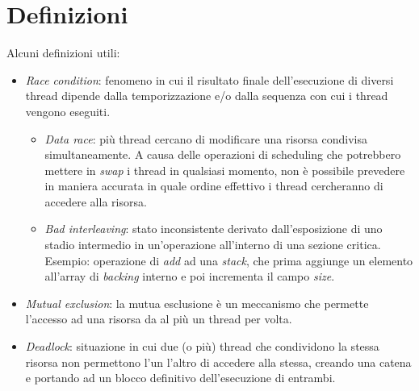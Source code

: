 \section{Definizioni}
Alcuni definizioni utili:
\begin{itemize}
	\item \textit{Race condition}: fenomeno in cui il risultato finale dell'esecuzione di diversi thread dipende dalla temporizzazione e/o dalla sequenza con cui i thread vengono eseguiti.
	\begin{itemize}
		\item \textit{Data race}: più thread cercano di modificare una risorsa condivisa simultaneamente. A causa delle operazioni di scheduling che potrebbero mettere in \textit{swap} i thread in qualsiasi momento, non è possibile prevedere in maniera accurata in quale ordine effettivo i thread cercheranno di accedere alla risorsa.
		\item \textit{Bad interleaving}: stato inconsistente derivato dall'esposizione di uno stadio intermedio in un'operazione all'interno di una sezione critica. Esempio: operazione di \textit{add} ad una \textit{stack}, che prima aggiunge un elemento all'array di \textit{backing} interno e poi incrementa il campo \textit{size}.
	\end{itemize}
	\item \textit{Mutual exclusion}: la mutua esclusione \`e un meccanismo che permette l'accesso ad una risorsa da al pi\`u un thread per volta.
	\item \textit{Deadlock}: situazione in cui due (o pi\`u) thread che condividono la stessa risorsa non permettono l'un l'altro di accedere alla stessa, creando una catena e portando ad un blocco definitivo dell'esecuzione di entrambi.
\end{itemize}